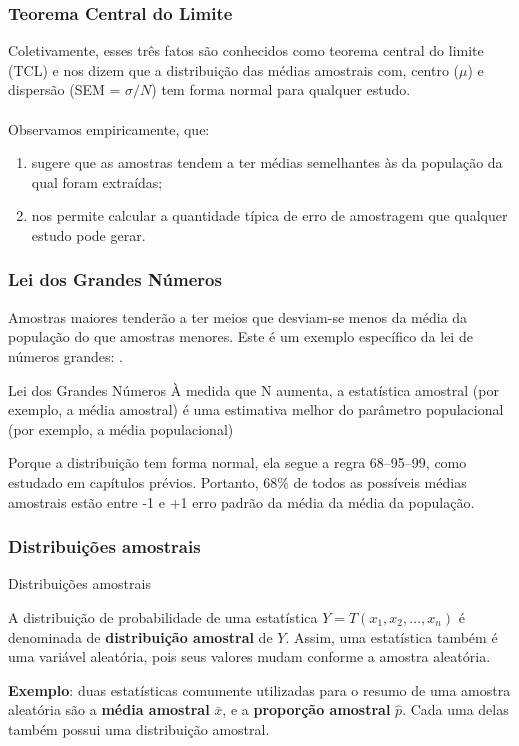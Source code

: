 \documentclass[11pt]{beamer}
\begin{document}
\begin{frame}
\frametitle{Teorema Central do Limite}
Coletivamente, esses três fatos são conhecidos como teorema central do limite  (TCL) e nos dizem que a distribuição das médias amostrais com, centro (\(\mu\)) e dispersão (SEM = \(\sigma/N\)) tem forma normal para qualquer estudo.\\~\\ 

Observamos empiricamente, que:
\begin{enumerate}
\item sugere que as amostras tendem a ter médias semelhantes às da população da qual foram extraídas;
\item nos permite calcular a quantidade típica de erro de amostragem que qualquer estudo pode gerar.
\end{enumerate}

\end{frame}

\begin{frame}
\frametitle{Lei dos Grandes Números}
Amostras maiores tenderão a ter meios que desviam-se menos da média da população do que amostras menores. Este é um exemplo específico da lei de números grandes: .
 \begin{alertblock}{Lei dos Grandes Números}
À medida que N aumenta, a estatística amostral (por exemplo, a média amostral) é uma estimativa melhor do parâmetro populacional (por exemplo, a média populacional)
\end{alertblock}

Porque a distribuição tem forma normal, ela segue a regra 68–95–99, como estudado em capítulos prévios. Portanto, 68\% de todos as possíveis médias amostrais estão entre -1 e +1 erro padrão da média da média da população.

\end{frame}

\begin{frame}
\frametitle{Distribuições amostrais}

\begin{block}{Distribuições amostrais}

A distribuição de probabilidade de uma estatística
\(Y = T(x_1, x_2, \ldots, x_n)\) é denominada de \textbf{distribuição
amostral} de \(Y\). Assim, uma estatística também é uma variável
aleatória, pois seus valores mudam conforme a amostra aleatória.
\end{block}

\begin{block}{}
\textbf{Exemplo}: duas estatísticas comumente utilizadas para o resumo
de uma amostra aleatória são a \textbf{média amostral} \(\bar{x}\), e a
\textbf{proporção amostral} \(\hat{p}\). Cada uma delas também possui
uma distribuição amostral.
\end{block}
\end{frame}
\end{document}
